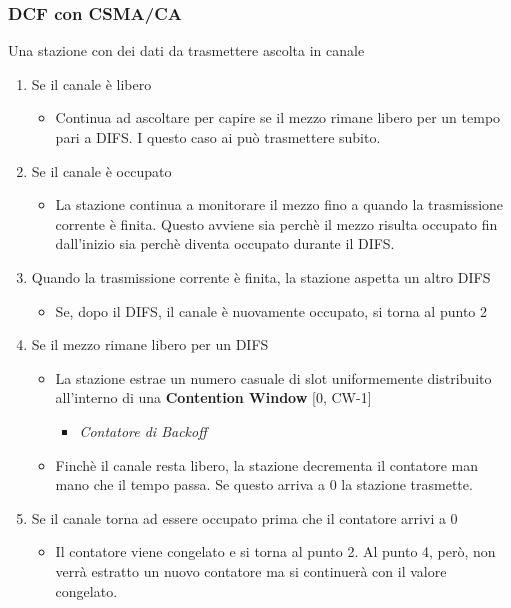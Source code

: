 \documentclass{article}
\begin{document}
            \subsubsection{DCF con CSMA/CA}
                Una stazione con dei dati da trasmettere ascolta in canale
                \begin{enumerate}
                    \item Se il canale è libero
                          \begin{itemize}
                              \item Continua ad ascoltare per capire se il mezzo rimane libero per un tempo pari a DIFS. I questo caso ai può trasmettere subito.
                          \end{itemize}
                    \item Se il canale è occupato
                          \begin{itemize}
                              \item La stazione continua a monitorare il mezzo fino a quando la trasmissione corrente è finita. Questo avviene sia perchè il mezzo risulta occupato fin dall'inizio sia perchè diventa occupato durante il DIFS.
                          \end{itemize}
                    \item Quando la trasmissione corrente è finita, la stazione aspetta un altro DIFS
                          \begin{itemize}
                              \item Se, dopo il DIFS, il canale è nuovamente occupato, si torna al punto 2
                          \end{itemize}
                    \item Se il mezzo rimane libero per un DIFS
                          \begin{itemize}
                              \item La stazione estrae un numero casuale di slot uniformemente distribuito all'interno di una \textbf{Contention Window} [0, CW-1]
                                    \begin{itemize}
                                        \item \textit{Contatore di Backoff}
                                    \end{itemize}
                              \item Finchè il canale resta libero, la stazione decrementa il contatore man mano che il tempo passa. Se questo arriva a 0 la stazione trasmette.                       
                          \end{itemize}
                    \item Se il canale torna ad essere occupato prima che il contatore arrivi a 0
                          \begin{itemize}
                              \item Il contatore viene congelato e si torna al punto 2. Al punto 4, però, non verrà estratto un nuovo contatore ma si continuerà con il valore congelato.
                          \end{itemize}
                \end{enumerate}
\end{document}
